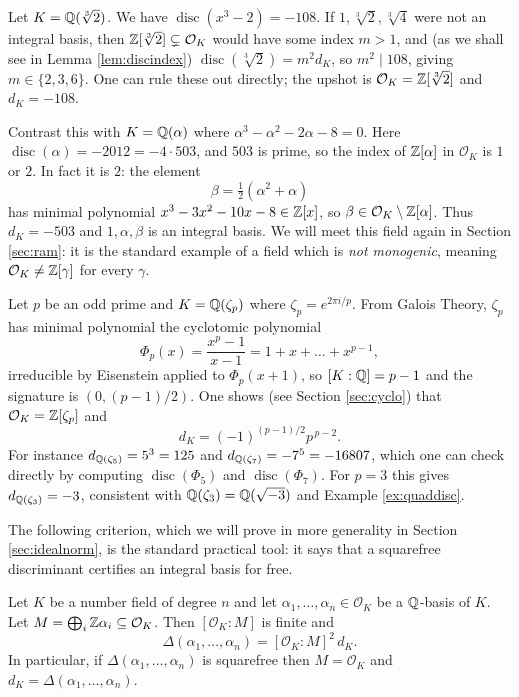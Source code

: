 \documentclass[a4paper]{scrartcl}
\renewcommand{\OO}{\mathcal{O}}
\newcommand{\disc}{\operatorname{disc}}
\begin{document}
\begin{example}\label{ex:cubicdisc}
	Let $K = \mathbb{Q}(\sqrt[3]2)$. We have $\disc(x^3 - 2) = -108$. If $1, \sqrt[3]2, \sqrt[3]4$ were not an integral basis, then $\Z[\sqrt[3]2] \subsetneq \OO_K$ would have some index $m > 1$, and (as we shall see in Lemma \ref{lem:discindex}) $\disc(\sqrt[3]2) = m^2 d_K$, so $m^2 \mid 108$, giving $m \in \{2, 3, 6\}$. One can rule these out directly; the upshot is $\OO_K = \Z[\sqrt[3]2]$ and $d_K = -108$.

	Contrast this with $K = \mathbb{Q}(\alpha)$ where $\alpha^3 - \alpha^2 - 2\alpha - 8 = 0$. Here $\disc(\alpha) = -2012 = -4 \cdot 503$, and $503$ is prime, so the index of $\mathbb{Z}[\alpha]$ in $\OO_K$ is $1$ or $2$. In fact it is $2$: the element
	$$\beta = \tfrac12(\alpha^2 + \alpha)$$
	has minimal polynomial $x^3 - 3x^2 - 10x - 8 \in \mathbb{Z}[x]$, so $\beta \in \OO_K \setminus \Z[\alpha]$. Thus $d_K = -503$ and $1, \alpha, \beta$ is an integral basis. We will meet this field again in Section \ref{sec:ram}: it is the standard example of a field which is \emph{not monogenic}, meaning $\OO_K \neq \Z[\gamma]$ for every $\gamma$.
\end{example}

\begin{example}\label{ex:cyclodisc}
	Let $p$ be an odd prime and $K = \mathbb{Q}(\zeta_p)$ where $\zeta_p = e^{2\pi i/p}$. From Galois Theory, $\zeta_p$ has minimal polynomial the cyclotomic polynomial
	$$\Phi_p(x) = \frac{x^p-1}{x-1} = 1 + x + \dots + x^{p-1},$$
	irreducible by Eisenstein applied to $\Phi_p(x+1)$, so $[K:\mathbb{Q}] = p-1$ and the signature is $(0, (p-1)/2)$. One shows (see Section \ref{sec:cyclo}) that $\OO_K = \Z[\zeta_p]$ and
	$$d_K = (-1)^{(p-1)/2}p^{\,p-2}.$$
	For instance $d_{\mathbb{Q}(\zeta_5)} = 5^3 = 125$ and $d_{\mathbb{Q}(\zeta_7)} = -7^5 = -16807$, which one can check directly by computing $\disc(\Phi_5)$ and $\disc(\Phi_7)$. For $p = 3$ this gives $d_{\mathbb{Q}(\zeta_3)} = -3$, consistent with $\mathbb{Q}(\zeta_3) = \mathbb{Q}(\sqrt{-3})$ and Example \ref{ex:quaddisc}.
\end{example}

The following criterion, which we will prove in more generality in Section \ref{sec:idealnorm}, is the standard practical tool: it says that a squarefree discriminant certifies an integral basis for free.

\begin{lemma}\label{lem:discindex}
	Let $K$ be a number field of degree $n$ and let $\alpha_1, \dots, \alpha_n \in \OO_K$ be a $\mathbb{Q}$-basis of $K$. Let $M = \bigoplus_i\Z\alpha_i \subseteq \OO_K$. Then $[\OO_K : M]$ is finite and
	$$\Delta(\alpha_1, \dots, \alpha_n) = [\OO_K : M]^2\, d_K.$$
	In particular, if $\Delta(\alpha_1,\dots,\alpha_n)$ is squarefree then $M = \OO_K$ and $d_K = \Delta(\alpha_1,\dots,\alpha_n)$.
\end{lemma}
\end{document}
